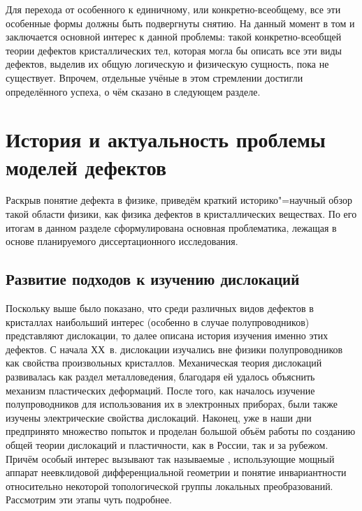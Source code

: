 \documentclass[a4paper, 14pt, titlepage]{extarticle}
\begin{document}
  Для перехода от особенного к единичному, или конкретно-всеобщему, все эти особенные формы должны
  быть подвергнуты снятию. На данный момент в том и заключается основной интерес к данной проблемы:
  такой конкретно-всеобщей теории дефектов кристаллических тел, которая могла бы описать все эти
  виды дефектов, выделив их общую логическую и физическую сущность, пока не существует. Впрочем,
  отдельные учёные в этом стремлении достигли определённого успеха, о чём сказано в следующем разделе.

  \section{История и актуальность проблемы моделей дефектов}

  Раскрыв понятие дефекта в физике, приведём краткий историко"=научный обзор такой области физики,
  как физика дефектов в кристаллических веществах. По его итогам в данном разделе сформулирована
  основная проблематика, лежащая в основе планируемого диссертационного исследования.

  \subsection{Развитие подходов к изучению дислокаций}

  Поскольку выше было показано, что среди различных видов дефектов в кристаллах наибольший интерес
  (особенно в случае полупроводников) представляют дислокации, то далее описана история изучения именно этих дефектов.
  С начала ХХ~в. дислокации изучались вне физики полупроводников как свойства произвольных
  кристаллов. Механическая теория дислокаций развивалась как раздел металловедения, благодаря ей
  удалось объяснить механизм пластических деформаций. После того, как началось изучение
  полупроводников для использования их в электронных приборах, были также изучены электрические
  свойства дислокаций. Наконец, уже в наши дни предпринято множество попыток и проделан большой
  объём работы по созданию общей теории дислокаций и пластичности, как в России, так и за рубежом.
  Причём особый интерес вызывают так называемые , использующие мощный
  аппарат неевклидовой дифференциальной геометрии и понятие инвариантности относительно некоторой
  топологической группы локальных преобразований. Рассмотрим эти этапы чуть подробнее.
\end{document}
